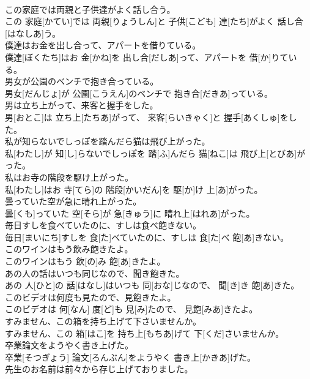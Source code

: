 \documentclass[8pt]{extreport}
\begin{document}
\begin{CJK}{UTF8}{min}
\\	この家庭では両親と子供達がよく話し合う。	
\\	この 家庭[かてい]では 両親[りょうしん]と 子供[こども] 達[たち]がよく 話し合[はなしあ]う。
\\	僕達はお金を出し合って、アパートを借りている。	
\\	僕達[ぼくたち]はお 金[かね]を 出し合[だしあ]って、アパートを 借[か]りている。
\\	男女が公園のベンチで抱き合っている。	
\\	男女[だんじょ]が 公園[こうえん]のベンチで 抱き合[だきあ]っている。
\\	男は立ち上がって、来客と握手をした。	
\\	男[おとこ]は 立ち上[たちあ]がって、 来客[らいきゃく]と 握手[あくしゅ]をした。
\\	私が知らないでしっぽを踏んだら猫は飛び上がった。	
\\	私[わたし]が 知[し]らないでしっぽを 踏[ふ]んだら 猫[ねこ]は 飛び上[とびあ]がった。
\\	私はお寺の階段を駆け上がった。	
\\	私[わたし]はお 寺[てら]の 階段[かいだん]を 駆[か]け 上[あ]がった。
\\	曇っていた空が急に晴れ上がった。	
\\	曇[くも]っていた 空[そら]が 急[きゅう]に 晴れ上[はれあ]がった。
\\	毎日すしを食べていたのに、すしは食べ飽きない。	
\\	毎日[まいにち]すしを 食[た]べていたのに、すしは 食[た]べ 飽[あ]きない。
\\	このワインはもう飲み飽きたよ。	
\\	このワインはもう 飲[の]み 飽[あ]きたよ。
\\	あの人の話はいつも同じなので、聞き飽きた。	
\\	あの 人[ひと]の 話[はなし]はいつも 同[おな]じなので、 聞[き]き 飽[あ]きた。
\\	このビデオは何度も見たので、見飽きたよ。	
\\	このビデオは 何[なん] 度[ど]も 見[み]たので、 見飽[みあ]きたよ。
\\	すみません、この箱を持ち上げて下さいませんか。	
\\	すみません、この 箱[はこ]を 持ち上[もちあ]げて 下[くだ]さいませんか。
\\	卒業論文をようやく書き上げた。	
\\	卒業[そつぎょう] 論文[ろんぶん]をようやく 書き上[かきあ]げた。
\\	先生のお名前は前々から存じ上げておりました。	

\end{CJK}
\end{document}
